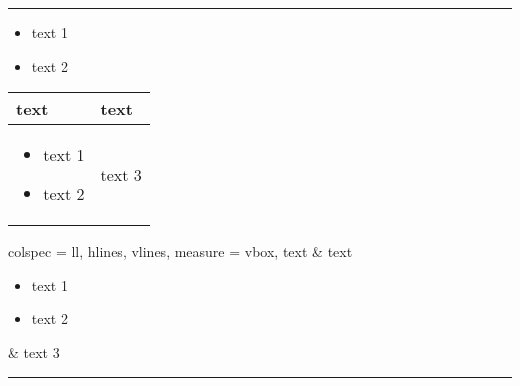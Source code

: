 \documentclass{article}
\begin{document}
\hrule

\begin{itemize}
  \item text 1
  \item text 2
\end{itemize}

\START

\vspace{2em}

\begin{tabular}{|p{1.8cm}|l|}
  \hline
  text & text \\
  \hline
  \begin{itemize}
    \item text 1
    \item text 2
  \end{itemize} & text 3 \\
  \hline
\end{tabular}
\qquad
\begin{tblr}{
  colspec = {ll}, hlines, vlines,
  measure = vbox,
}
  text & text \\
  \begin{itemize}
    \item text 1
    \item text 2
  \end{itemize} & text 3 \\
\end{tblr}
\ENDTEST

\bigskip\hrule\bigskip
\end{document}

